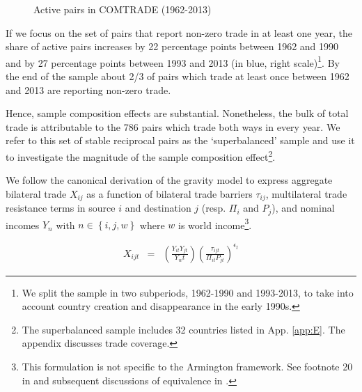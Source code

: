 \documentclass[12pt,twoside,a4paper,notitlepage]{article}
\begin{document}
\begin{figure}[h!]
\caption{Active pairs in COMTRADE (1962-2013) \label{fig:active_pairs}}
\begin{center}
\setlength{\fboxrule}{1pt} %
\setlength{\fboxsep}{.1in} %
\end{center}
\end{figure}

If we focus on the set of pairs that report non-zero trade in at least one year, the share of active pairs increases by 22 percentage points between 1962 and 1990 and by 27 percentage points between 1993 and 2013 (in blue, right scale)\footnote{We split the sample in two subperiods, 1962-1990 and 1993-2013, to take into account country creation and disappearance in the early 1990s.}. By the end of the sample about 2/3 of pairs which trade at least once between 1962 and 2013 are reporting non-zero trade. 

Hence, sample composition effects are substantial. Nonetheless, the bulk of total trade is attributable to the 786 pairs which trade both ways in every year. We refer to this set of stable reciprocal pairs as the `superbalanced' sample and use it to investigate the magnitude of the sample composition effect\footnote{The superbalanced sample includes 32 countries listed in App. \ref{app:E}. The appendix discusses trade coverage.}.

We follow the canonical \cite{anderson2003} derivation of the gravity model to express aggregate bilateral trade $X_{ij}$ as a function of bilateral trade barriers $\tau_{ij}$, multilateral trade resistance terms in source $i$ and destination $j$ (resp. $\Pi_{i}$ and $P_{j}$), and nominal incomes $Y_{n}$ with $n\in\left\{i,j,w\right\}$ where $w$ is world income\footnote{This formulation is not specific to the Armington framework. See footnote 20 in \cite{Eaton2002} and subsequent discussions of equivalence in  \cite{Arkolakis2012, Head2013}.}. 
 
\begin{eqnarray}
X_{ijt} & = & \left(\frac{Y_{it}Y_{jt}}{Y_wt}\right)\left(\frac{\tau_{ijt}}{\Pi_{it}P_{jt}}\right)^{\epsilon_t}\label{eqn:1}
\end{eqnarray}
\end{document}
